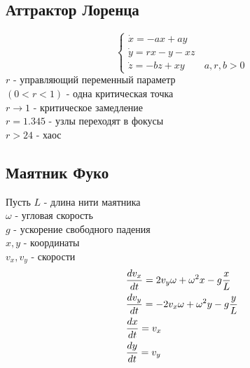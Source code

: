 \subsection{Аттрактор Лоренца}
\begin{equation}
  \begin{cases}
    \dot{x}=-ax+ay\\
    \dot{y}=rx-y-xz\\
    \dot{z}=-bz+xy \qquad a,r,b>0
  \end{cases}
\end{equation}
$r$ - управляющий переменный параметр\\
$(0<r<1)$ - одна критическая точка\\
$r\to 1$ - критическое замедление\\
$r=1.345$ - узлы переходят в фокусы\\
$r>24$ - хаос

\subsection{Маятник Фуко}
Пусть $L$ - длина нити маятника\\
$\omega$ - угловая скорость\\
$g$ - ускорение свободного падения\\
$x,y$ - координаты\\
$v_x, v_y$ - скорости
\begin{align}
  &\dfrac{d v_x}{dt} = 2v_y\omega+\omega^2x-g\dfrac{x}{L}\notag\\
  &\dfrac{d v_y}{dt} = -2v_x\omega+\omega^2y-g\dfrac{y}{L}\\
  &\dfrac{d x}{dt} = v_x\notag\\
  &\dfrac{d y}{dt} = v_y\notag
\end{align}
